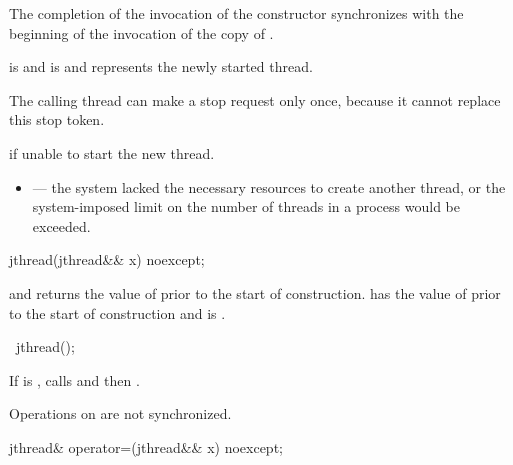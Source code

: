\begin{itemdescr}
\pnum
\sync
The completion of the invocation of the constructor
synchronizes with the beginning of the invocation of the copy of .

\pnum
\ensures
{} is 
and  is 
and  represents the newly started thread.
\begin{note}
The calling thread can make a stop request only once,
because it cannot replace this stop token.
\end{note}

\pnum
\throws
{} if unable to start the new thread.

\pnum
\errors
\begin{itemize}
\item {} --- the system lacked
the necessary resources to create another thread,
or the system-imposed limit on the number of threads in a process
would be exceeded.
\end{itemize}
\end{itemdescr}

%
\begin{itemdecl}
jthread(jthread&& x) noexcept;
\end{itemdecl}

\begin{itemdescr}
\pnum
\ensures
{}
and  returns the value of 
prior to the start of construction.
 has the value of 
prior to the start of construction
and  is .
\end{itemdescr}

%
\begin{itemdecl}
~jthread();
\end{itemdecl}

\begin{itemdescr}
\pnum
\effects
If  is ,
calls  and then .
\begin{note}
Operations on  are not synchronized.
\end{note}
\end{itemdescr}

%
\begin{itemdecl}
jthread& operator=(jthread&& x) noexcept;
\end{itemdecl}


